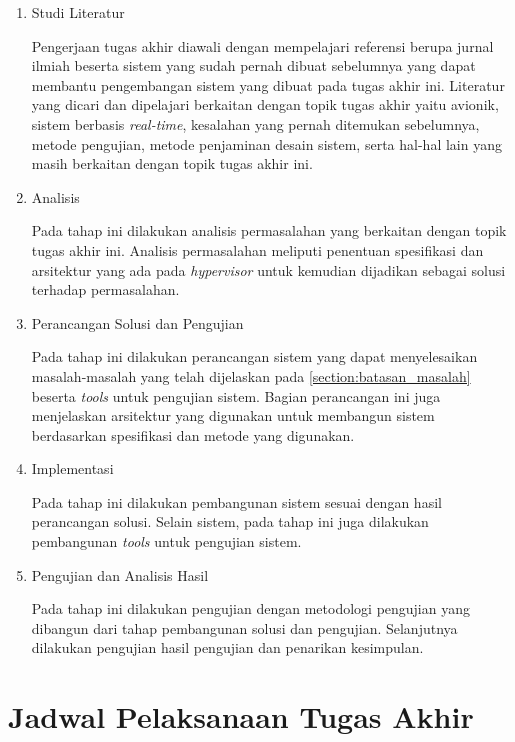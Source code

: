 \begin{enumerate}

    \item Studi Literatur

        Pengerjaan tugas akhir diawali dengan mempelajari referensi berupa jurnal ilmiah beserta sistem yang sudah
        pernah dibuat sebelumnya yang dapat membantu pengembangan sistem yang dibuat pada tugas akhir ini.  Literatur
        yang dicari dan dipelajari berkaitan dengan topik tugas akhir yaitu avionik, sistem berbasis \textit{real-time},
        kesalahan yang pernah ditemukan sebelumnya, metode pengujian, metode penjaminan desain sistem, serta hal-hal
        lain yang masih berkaitan dengan topik tugas akhir ini.

    \item Analisis

        Pada tahap ini dilakukan analisis permasalahan yang berkaitan dengan topik tugas akhir ini. Analisis
        permasalahan meliputi penentuan spesifikasi dan arsitektur yang ada pada \textit{hypervisor} untuk kemudian
        dijadikan sebagai solusi terhadap permasalahan.

    \item Perancangan Solusi dan Pengujian

        Pada tahap ini dilakukan perancangan sistem yang dapat menyelesaikan masalah\hyp{}masalah yang telah dijelaskan
        pada \autoref{section:batasan_masalah} beserta \textit{tools} untuk pengujian sistem. Bagian perancangan ini
        juga menjelaskan arsitektur yang digunakan untuk membangun sistem berdasarkan spesifikasi dan metode yang
        digunakan.


    \item Implementasi

        Pada tahap ini dilakukan pembangunan sistem sesuai dengan hasil perancangan solusi. Selain sistem, pada tahap
        ini juga dilakukan pembangunan \textit{tools} untuk pengujian sistem.

    \item Pengujian dan Analisis Hasil

        Pada tahap ini dilakukan pengujian dengan metodologi pengujian yang dibangun dari tahap pembangunan solusi dan
        pengujian. Selanjutnya dilakukan pengujian hasil pengujian dan penarikan kesimpulan.

\end{enumerate}

\section{Jadwal Pelaksanaan Tugas Akhir}

